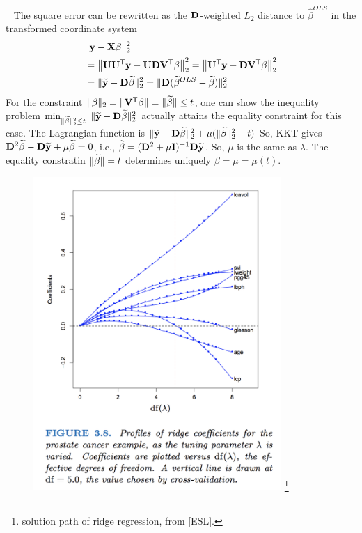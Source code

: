 \documentclass[english,handout]{beamer}
\newcommand{\U}{{\bf U}}
\newcommand{\D}{{\bf D}}
\newcommand{\V}{{\bf V}}
\newcommand{\y}{{\bf y}}
\newcommand{\bh}{{ \hat{\beta} }}
\theoremstyle{definition}
\begin{document}
 


 \frame
 {~
 {\footnotesize 
  The   square error can be rewritten  as the 
  $\D$-weighted $L_2$ distance to $\bh^{OLS}$
in the transformed coordinate system
 \begin{align*}
 &\|{\bf y}- {\bf X} \beta\|_2^2 
 \\
 &= \norm{\U\U^\tr \y -\U\D\V^\tr \beta}_2^2
 =\norm{\U^\tr \y -\D\V^\tr \beta}_2^2
 \\
&=\| \wt{\y}- \D \wt{\beta}\|_2^2
  =\| \D ( \wt{\beta}^{OLS}-  \wt{\beta})\|_2^2
  \end{align*}
  For  the constraint $\|\beta\|_2=\|\V^\tr \beta\|=\|\wt{\beta}\|\leq t$,
  one can show the inequality problem 
$\min_{\|\wt{\beta}\|_2^2 \leq t} ~\| \wt{\y}- \D \wt{\beta}\|_2^2
    $ 
    actually attains   the equality constraint for this case.
    The Lagrangian function is 
    $\| \wt{\y}- \D \wt{\beta}\|_2^2 + \mu ( \|\wt{\beta}\|_2^2  -t)  $
    So, KKT gives $\D^2 \wt{\beta} -   \D  \wt{\y} + \mu \wt{\beta}=0 $, i.e., 
    $\wt{\beta}= (\D^2+\mu\eye)^{-1} \D\wt{\y}$. So, 
    $\mu$ is the same as $\lambda$.
    The equality constratin  $\|{\widetilde{\beta}}\|=t$ determines
    uniquely $\beta=\mu=\mu(t)$. 
  }  
}
 



\begin{frame} 
  \begin{figure}
    \includegraphics[width=0.84\textwidth, height=0.7\textwidth]{fig_ridge_path.png}
\footnote{%
solution path  of ridge regression, from [ESL]. }
  \end{figure}

\end{frame}
\end{document}
